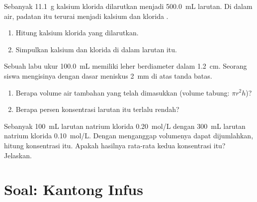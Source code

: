 \begin{exercise}[$\star\star\star$]\label{exo:g10:concentration-and-dilution:13}
Sebanyak \qty{11.1}{g} kalsium klorida  dilarutkan menjadi
\qty{500.0}{mL} larutan. Di dalam air, padatan itu terurai menjadi 
kalsium  dan  klorida .
\begin{enumerate}
  \item Hitung  kalsium klorida yang dilarutkan.
  \item Simpulkan   kalsium dan  klorida di dalam
        larutan itu.
\end{enumerate}
\end{exercise}

\begin{exercise}[$\star\star\star$]\label{exo:g10:concentration-and-dilution:14}
Sebuah labu ukur \qty{100.0}{mL} memiliki leher berdiameter dalam
\qty{1.2}{cm}. Seorang siswa mengisinya dengan dasar meniskus
\qty{2}{mm} di atas tanda batas.
\begin{enumerate}
  \item Berapa volume air tambahan yang telah dimasukkan (volume tabung:
        $\pi r^2 h$)?
  \item Berapa persen konsentrasi larutan itu terlalu rendah?
\end{enumerate}
\end{exercise}

\begin{exercise}[$\star\star\star$]\label{exo:g10:concentration-and-dilution:15}
Sebanyak \qty{100}{mL} larutan natrium klorida \qty{0.20}{mol/L}
 dengan \qty{300}{mL} larutan natrium klorida \qty{0.10}{mol/L}.
Dengan menganggap volumenya dapat dijumlahkan, hitung konsentrasi
 itu. Apakah hasilnya rata-rata kedua konsentrasi itu? Jelaskan.
\end{exercise}

\section{Soal: Kantong Infus}

